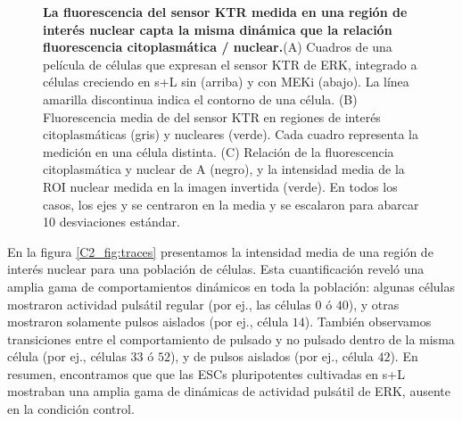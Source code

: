 \documentclass[./main.tex]{subfiles}
\begin{document}
\begin{figure}
    \caption{\textbf{La fluorescencia del sensor KTR medida en una región de interés nuclear capta la misma dinámica que la relación fluorescencia citoplasmática / nuclear.}(A) Cuadros de una película de células que expresan el sensor KTR de ERK, integrado a células creciendo en s+L sin (arriba) y con MEKi (abajo). La línea amarilla discontinua indica el contorno de una célula. (B) Fluorescencia media de del sensor KTR en regiones de interés citoplasmáticas (gris) y nucleares (verde). Cada cuadro representa la medición en una célula distinta. (C) Relación de la fluorescencia citoplasmática y nuclear de A (negro), y la intensidad media de la ROI nuclear medida en la imagen invertida (verde). En todos los casos, los ejes y se centraron en la media y se escalaron para abarcar 10 desviaciones estándar.}
    \label{C2_fig:citoplasma_nucleo}
\end{figure}


En la figura \ref{C2_fig:traces} presentamos la intensidad media de una región de interés nuclear para una población de células. Esta cuantificación reveló una amplia gama de comportamientos dinámicos en toda la población: algunas células mostraron actividad pulsátil regular (por ej., las células $0$ ó $40$), y otras mostraron solamente pulsos aislados (por ej., célula $14$). También observamos transiciones entre el comportamiento de pulsado y no pulsado dentro de la misma célula (por ej., células $33$ ó $52$), y de pulsos aislados (por ej., célula $42$). En resumen, encontramos que que las ESCs pluripotentes cultivadas en s+L mostraban una amplia gama de dinámicas de actividad pulsátil de ERK, ausente en la condición control.


\end{document}
